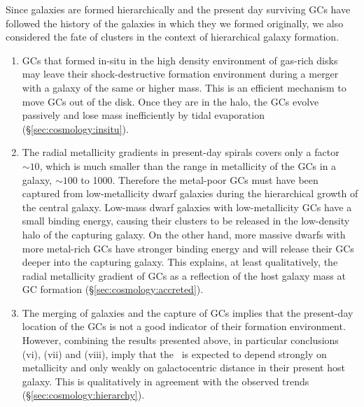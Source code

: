\documentclass{aa}
\begin{document}
Since galaxies are formed hierarchically and the present day surviving GCs have followed the history of the galaxies
in which they we formed originally, we also considered the fate of clusters in the context of hierarchical galaxy formation.
\begin{enumerate}
\item[(vii)] GCs that formed in-situ in the high density environment of gas-rich disks may leave their shock-destructive 
formation environment during a merger with a galaxy of the same or higher mass. This is an efficient mechanism to move GCs out of the disk. Once they are in the halo, the GCs evolve passively and lose mass inefficiently by tidal evaporation
(\S \ref{sec:cosmology:insitu}).
\item[(viii)] The radial metallicity gradients in present-day spirals covers only a factor $\sim 10$, which is much smaller than the
range in metallicity of the GCs in a galaxy, $\sim100$ to 1000. Therefore the metal-poor GCs must have  
been captured from low-metallicity dwarf galaxies during the hierarchical growth of the central galaxy. Low-mass dwarf galaxies
with  low-metallicity GCs have a small binding energy, causing their clusters to be  released in the low-density 
halo of the capturing galaxy.  On the other hand, more massive dwarfs with more metal-rich GCs have stronger binding energy and will release their GCs deeper into the capturing galaxy. This explains, at least qualitatively, the radial metallicity gradient of GCs as a reflection of the host galaxy mass at GC formation (\S \ref{sec:cosmology:accreted}).
\item[(ix)] The merging of galaxies and the capture of GCs implies that the present-day 
location of the GCs is not a good indicator of their formation environment. However, combining the results presented 
above, in particular conclusions (vi), (vii) and (viii), imply that the \Rgcst\ is expected to depend strongly on metallicity
and only weakly on galactocentric distance in their present host galaxy. This is qualitatively in agreement with the 
observed trends (\S \ref{sec:cosmology:hierarchy}).
\end{enumerate}
\end{document}
